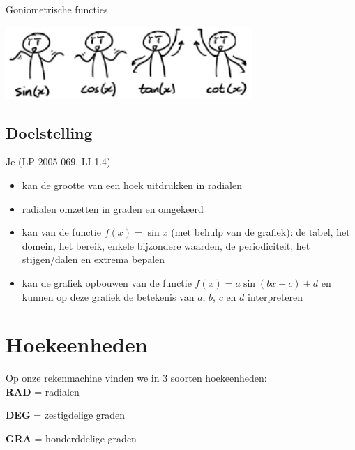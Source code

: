 \documentclass[a4paper,12pt,twoside ]{article}
\begin{document}
\thispagestyle{empty}
\begin{center}
  \begin{mdframed}
  \centering
  \fontsize{40}{50}\selectfont Goniometrische functies
  \end{mdframed}
  \vfill
  \includegraphics[width=0.7\textwidth]{gon-dance-moves}
  \vfill
\end{center}
\subsection*{Doelstelling}
Je \hfill  {\scriptsize(LP 2005-069, LI 1.4)}
\begin{itemize}
  \item kan de grootte van een hoek uitdrukken in radialen
  \item radialen omzetten in graden en omgekeerd
  \item kan van de functie $f(x)=\sin x$ (met behulp van de grafiek): de tabel, het domein, het bereik, enkele bijzondere waarden, de periodiciteit, het stijgen/dalen en extrema bepalen
  \item kan de grafiek opbouwen van de functie $f(x) = a \sin(bx+c)+d$ en kunnen op deze grafiek de betekenis van $a$, $b$, $c$ en $d$ interpreteren
\end{itemize}

\mbox{}
\clearpage
\thispagestyle{empty}
{\singlespacing \tableofcontents}
\clearpage

\pagestyle{fancy}
\fancyhead[RE,LO]{}

\onehalfspacing


\section{Hoekeenheden}
Op onze rekenmachine vinden we in  3 soorten hoekeenheden:\\

\textbf{RAD} = radialen

\textbf{DEG} = zestigdelige graden

\textbf{GRA} = honderddelige graden
\end{document}
